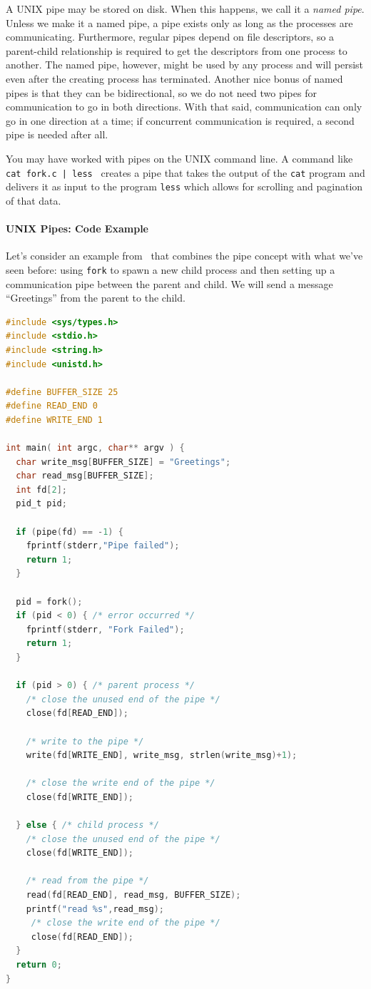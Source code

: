 \documentclass[a4paper]{report}
\begin{document}
A UNIX pipe may be stored on disk. When this happens, we call it a \textit{named pipe}. Unless we make it a named pipe, a pipe exists only as long as the processes are communicating. Furthermore, regular pipes depend on file descriptors, so a parent-child relationship is required to get the descriptors from one process to another. The named pipe, however, might be used by any process and will persist even after the creating process has terminated. Another nice bonus of named pipes is that they can be bidirectional, so we do not need two pipes for communication to go in both directions. With that said, communication can only go in one direction at a time; if concurrent communication is required, a second pipe is needed after all.

You may have worked with pipes on the UNIX command line. A command like \texttt{ cat fork.c | less } creates a pipe that takes the output of the \texttt{cat} program and delivers it as input to the program \texttt{less} which allows for scrolling and pagination of that data.

\paragraph{UNIX Pipes: Code Example}

Let's consider an example from~\cite{osc} that combines the pipe concept with what we've seen before: using \texttt{fork} to spawn a new child process and then setting up a communication pipe between the parent and child. We will send a message ``Greetings'' from the parent to the child.

\begin{lstlisting}[language=C]
#include <sys/types.h> 
#include <stdio.h> 
#include <string.h> 
#include <unistd.h>

#define BUFFER_SIZE 25
#define READ_END 0 
#define WRITE_END 1

int main( int argc, char** argv ) {
  char write_msg[BUFFER_SIZE] = "Greetings"; 
  char read_msg[BUFFER_SIZE];
  int fd[2];
  pid_t pid;

  if (pipe(fd) == -1) {
    fprintf(stderr,"Pipe failed");
    return 1;
  }
  
  pid = fork();
  if (pid < 0) { /* error occurred */ 
    fprintf(stderr, "Fork Failed"); 
    return 1;
  }

  if (pid > 0) { /* parent process */
    /* close the unused end of the pipe */ 
    close(fd[READ_END]);
    
    /* write to the pipe */
    write(fd[WRITE_END], write_msg, strlen(write_msg)+1);
    
    /* close the write end of the pipe */
    close(fd[WRITE_END]);
    
  } else { /* child process */
    /* close the unused end of the pipe */ 
    close(fd[WRITE_END]);
    
    /* read from the pipe */
    read(fd[READ_END], read_msg, BUFFER_SIZE); 
    printf("read %s",read_msg);
     /* close the write end of the pipe */
     close(fd[READ_END]);
  }
  return 0;
}
\end{lstlisting}
\end{document}
